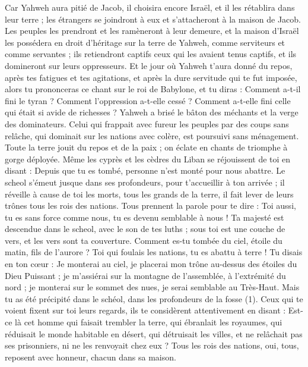 \begin{multicols}{2}
\VerseOne{}Car Yahweh aura pitié de Jacob, il choisira encore Israël, et il les rétablira dans leur terre ; les étrangers se joindront à eux et s'attacheront à la maison de Jacob.
Les peuples les prendront et les ramèneront à leur demeure, et la maison d'Israël les possédera en droit d'héritage sur la terre de Yahweh, comme serviteurs et comme servantes ; ils retiendront captifs ceux qui les avaient tenus captifs, et ils domineront sur leurs oppresseurs.
Et le jour où Yahweh t’aura donné du repos, après tes fatigues et tes agitations, et après la dure servitude qui te fut imposée,
alors tu prononceras ce chant sur le roi de Babylone, et tu diras : Comment a-t-il fini le tyran ? Comment l’oppression a-t-elle cessé ? Comment a-t-elle fini celle qui était si avide de richesses ?
Yahweh a brisé le bâton des méchants et la verge des dominateurs.
Celui qui frappait avec fureur les peuples par des coups sans relâche, qui dominait sur les nations avec colère, est poursuivi sans ménagement.
Toute la terre jouit du repos et de la paix ; on éclate en chants de triomphe à gorge déployée.
Même les cyprès et les cèdres du Liban se réjouissent de toi en disant : Depuis que tu es tombé, personne n'est monté pour nous abattre.
Le scheol s’émeut jusque dans ses profondeurs, pour t’accueillir à ton arrivée ; il réveille à cause de toi les morts, tous les grands de la terre, il fait lever de leurs trônes tous les rois des nations.
Tous prennent la parole pour te dire : Toi aussi, tu es sans force comme nous, tu es devenu semblable à nous !
Ta majesté est descendue dans le scheol, avec le son de tes luths ; sous toi est une couche de vers, et les vers sont ta couverture.
Comment es-tu tombée du ciel, étoile du matin, fils de l’aurore ? Toi qui foulais les nations, tu es abattu à terre !
Tu disais en ton cœur : Je monterai au ciel, je placerai mon trône au-dessus des étoiles du Dieu Puissant ; je m’assiérai sur la montagne de l’assemblée, à l’extrémité du nord ;
je monterai sur le sommet des nues, je serai semblable au Très-Haut.
Mais tu as été précipité dans le schéol, dans les profondeurs de la fosse (1).
Ceux qui te voient fixent sur toi leurs regards, ils te considèrent attentivement en disant : Est-ce là cet homme qui faisait trembler la terre, qui ébranlait les royaumes,
qui réduisait le monde habitable en désert, qui détruisait les villes, et ne relâchait pas ses prisonniers, ni ne les renvoyait chez eux ?
Tous les rois des nations, oui, tous, reposent avec honneur, chacun dans sa maison.

\end{multicols}
